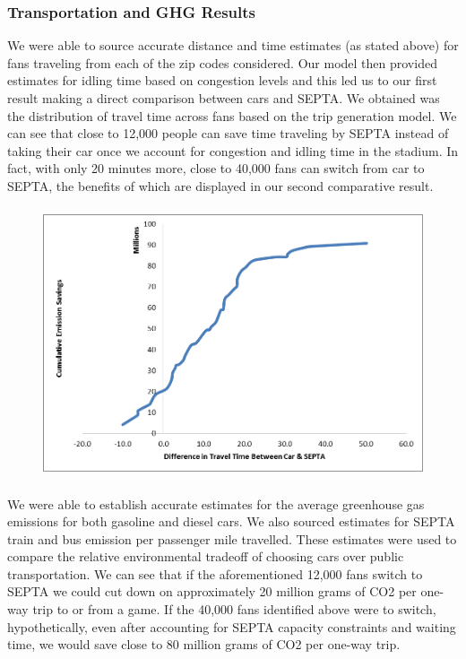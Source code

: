 \subsubsection{Transportation and GHG Results}

We were able to source accurate distance and time estimates (as stated
above) for fans traveling from each of the zip codes considered. Our
model then provided estimates for idling time based on congestion
levels and this led us to our first result making a direct comparison
between cars and SEPTA. We obtained was the distribution of travel
time across fans based on the trip generation model. We can see that
close to 12,000 people can save time traveling by SEPTA instead of
taking their car once we account for congestion and idling time in the
stadium. In fact, with only 20 minutes more, close to 40,000 fans can
switch from car to SEPTA, the benefits of which are displayed in our
second comparative result.

\begin{figure}[htp]
  \centering
  \includegraphics[height=8cm]{graphics/graph2.png}
  \caption{}
\end{figure}

We were able to establish accurate estimates for the average
greenhouse gas emissions for both gasoline and diesel cars. We also
sourced estimates for SEPTA train and bus emission per passenger mile
travelled. These estimates were used to compare the relative
environmental tradeoff of choosing cars over public transportation. We
can see that if the aforementioned 12,000 fans switch to SEPTA we
could cut down on approximately 20 million grams of CO2 per one-way
trip to or from a game. If the 40,000 fans identified above were to
switch, hypothetically, even after accounting for SEPTA capacity
constraints and waiting time, we would save close to 80 million grams
of CO2 per one-way trip.

